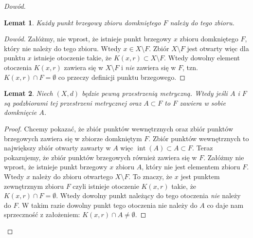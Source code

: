 \documentclass{article}
\newtheorem{lemma}{Lemat}
\DeclareMathOperator{\interior}{int}
\begin{document}
\begin{proof}[Dowód]
    \begin{lemma}
        Każdy punkt brzegowy zbioru domkniętego \(F\) należy do tego zbioru.
    \end{lemma}
    \begin{proof}[Dowód]
        Załóżmy, nie wprost, że istnieje punkt brzegowy \(x\) zbioru domkniętego \(F\), który nie należy do tego zbioru.
        Wtedy \(x \in X \setminus F\). Zbiór \(X \setminus F\) jest otwarty więc dla punktu \(x\) istnieje otoczenie
        takie, że \(K(x, r) \subset X \setminus F\). Wtedy dowolny element otoczenia \(K(x, r)\) zawiera się w
        \(X \setminus F\) i \emph{nie} zawiera się w \(F\), tzn. \(K(x, r) \cap F = \emptyset\) co przeczy
        definicji punktu brzegowego.
    \end{proof}
    \begin{lemma}
        Niech \((X, d)\) będzie pewną przestrzenią metryczną. Wtedy jeśli \(A\) i \(F\) są podzbiorami tej przestrzeni
        metrycznej oraz \(A \subset F\) to \(F\) zawiera w sobie domknięcie \(A\).
    \end{lemma}
    \begin{proof}
        Chcemy pokazać, że zbiór punktów wewnętrznych oraz zbiór punktów brzegowych zawiera się w zbiorze domkniętym \(F\).
        Zbiór punktów wewnętrznych to największy zbiór otwarty zawarty w \(A\) więc \(\interior{(A)} \subset A \subset F\).
        Teraz pokazujemy, że zbiór punktów brzegowych również zawiera się w \(F\). Załóżmy nie wprost, że istnieje
        punkt brzegowy \(x\) zbioru \(A\), który nie jest elementem zbioru \(F\). Wtedy \(x\) należy do zbioru otwartego
        \(X \setminus F\). To znaczy, że \(x\) jest punktem zewnętrznym zbioru \(F\) czyli istnieje otoczenie \(K(x, r)\)
        takie, że \(K(x,r) \cap F = \emptyset\). Wtedy dowolny punkt należący do tego otoczenia \emph{nie} należy do \(F\).
        W takim razie dowolny punkt tego otoczenia nie należy do \(A\) co daje nam sprzeczność z założeniem: \(K(x, r) \cap A \neq \emptyset\). 
    \end{proof}
\end{proof}
\end{document}
